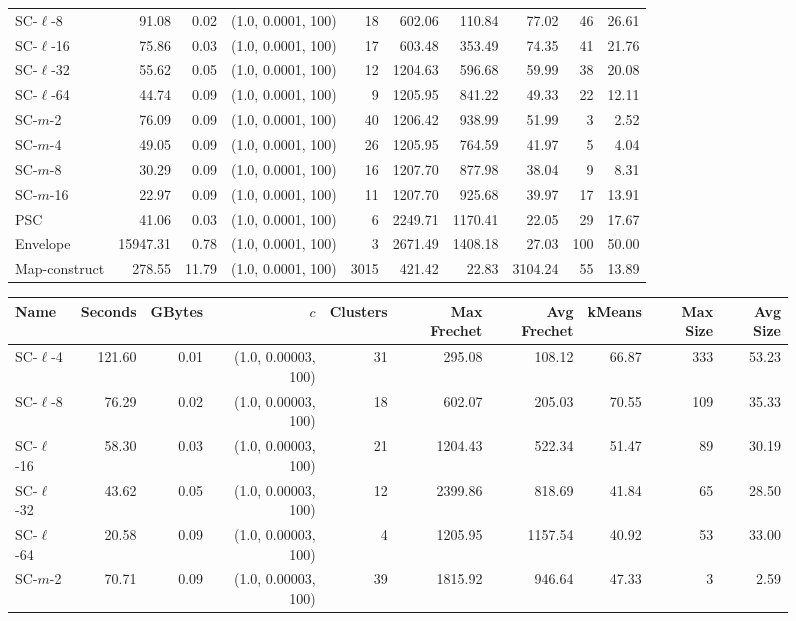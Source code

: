\begin{figure}
\begin{center}
\begin{minipage}{\textwidth}
{\begin{tabular}{@{}lrrrrrrrrr@{}}
SC-$\ell$-8 & 91.08 & 0.02 & (1.0, 0.0001, 100) & 18 & 602.06 & 110.84 & 77.02 & 46 & 26.61\\
SC-$\ell$-16 & 75.86 & 0.03 & (1.0, 0.0001, 100) & 17 & 603.48 & 353.49 & 74.35 & 41 & 21.76\\
SC-$\ell$-32 & 55.62 & 0.05 & (1.0, 0.0001, 100) & 12 & 1204.63 & 596.68 & 59.99 & 38 & 20.08\\
SC-$\ell$-64 & 44.74 & 0.09 & (1.0, 0.0001, 100) & 9 & 1205.95 & 841.22 & 49.33 & 22 & 12.11\\
SC-$m$-2 & 76.09 & 0.09 & (1.0, 0.0001, 100) & 40 & 1206.42 & 938.99 & 51.99 & 3 & 2.52\\
SC-$m$-4 & 49.05 & 0.09 & (1.0, 0.0001, 100) & 26 & 1205.95 & 764.59 & 41.97 & 5 & 4.04\\
SC-$m$-8 & 30.29 & 0.09 & (1.0, 0.0001, 100) & 16 & 1207.70 & 877.98 & 38.04 & 9 & 8.31\\
SC-$m$-16 & 22.97 & 0.09 & (1.0, 0.0001, 100) & 11 & 1207.70 & 925.68 & 39.97 & 17 & 13.91\\
PSC& 41.06 & 0.03 & (1.0, 0.0001, 100) & 6 & 2249.71 & 1170.41 & 22.05 & 29 & 17.67\\
Envelope & 15947.31 & 0.78 & (1.0, 0.0001, 100) & 3 & 2671.49 & 1408.18 & 27.03 & 100 & 50.00\\
Map-construct & 278.55 & 11.79 & (1.0, 0.0001, 100) & 3015 & 421.42 & 22.83 & 3104.24 & 55 & 13.89\\
        \bottomrule
    \end{tabular}
    }
    {
    \begin{tabular}{@{}lrrrrrrrrr@{}}
        \toprule
        Name & Seconds & GBytes & $c$ & Clusters & Max Frechet & Avg Frechet & kMeans & Max Size & Avg Size\\
        \midrule
        SC-$\ell$-4 & 121.60 & 0.01 & (1.0, 0.00003, 100) & 31 & 295.08 & 108.12 & 66.87 & 333 & 53.23\\
SC-$\ell$-8 & 76.29 & 0.02 & (1.0, 0.00003, 100) & 18 & 602.07 & 205.03 & 70.55 & 109 & 35.33\\
SC-$\ell$-16 & 58.30 & 0.03 & (1.0, 0.00003, 100) & 21 & 1204.43 & 522.34 & 51.47 & 89 & 30.19\\
SC-$\ell$-32 & 43.62 & 0.05 & (1.0, 0.00003, 100) & 12 & 2399.86 & 818.69 & 41.84 & 65 & 28.50\\
SC-$\ell$-64 & 20.58 & 0.09 & (1.0, 0.00003, 100) & 4 & 1205.95 & 1157.54 & 40.92 & 53 & 33.00\\
SC-$m$-2 & 70.71 & 0.09 & (1.0, 0.00003, 100) & 39 & 1815.92 & 946.64 & 47.33 & 3 & 2.59\\

\end{tabular}}
\end{minipage}
\end{center}
\end{figure}
